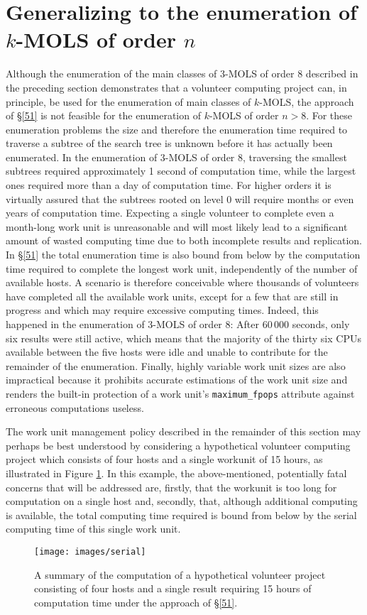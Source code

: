 \section{Generalizing to the enumeration of $k$-MOLS of order $n$}\label{5gen}
Although the enumeration of the main classes of 3-MOLS of order 8 described in the preceding section demonstrates that a volunteer computing project can, in principle,  be used for the enumeration of main classes of $k$-MOLS, the approach of \S\ref{51}   is not feasible for the enumeration of $k$-MOLS of order $n>8$. 
For these enumeration problems the size  and therefore   the enumeration time required to traverse a subtree of the search tree is unknown before it has actually been enumerated. 
In the enumeration of 3-MOLS of order 8, traversing the smallest subtrees required approximately 1 second of computation time, while the largest ones required more than a day of computation time. For higher orders it is virtually assured that the subtrees rooted on level 0 will require months or even years of computation time. Expecting a single volunteer to complete even a month-long work unit is unreasonable and will most likely lead to a significant amount of  wasted computing time due to both incomplete results and replication. 
In  \S\ref{51} the total enumeration time is also bound from below by the computation time required to complete the longest work unit, independently of the number of available hosts. A scenario is therefore conceivable  where thousands of volunteers have completed all the available work units, except for a few that are still in progress and which may require excessive computing times. Indeed, this happened in the enumeration of 3-MOLS of order 8: After $60\,000$ seconds,   only six results were still active, which means that the majority of the thirty six CPUs available between the five hosts were idle and unable to contribute for the remainder of the enumeration. 
Finally, highly variable work unit sizes are also impractical because it prohibits accurate estimations of the work unit size and renders the   built-in protection of a work unit's \verb|maximum_fpops| attribute against erroneous computations useless. 

The work unit management policy described in the remainder of this section may perhaps be best understood by considering a hypothetical volunteer computing project which consists of four hosts and a single workunit of 15 hours, as illustrated in Figure \ref{fig:5ser}. In this example, the above-mentioned, potentially fatal concerns that will be addressed are, firstly, that the workunit is too long for computation on a single host and, secondly, that, although additional computing is available, the total computing time required is bound from below by the serial computing time of this single work unit.
\begin{figure}[h]
\centering
\texttt{[image: images/serial]}
\caption{A summary of the computation of a hypothetical volunteer project consisting of four hosts and a single result requiring 15 hours of computation time under the approach of \S\ref{51}.} \label{fig:5ser}
\end{figure}
 

